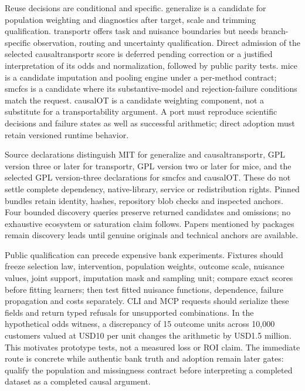 Reuse decisions are conditional and specific. generalize is a candidate for population weighting and diagnostics after target, scale and trimming qualification. transportr offers task and nuisance boundaries but needs branch-specific observation, routing and uncertainty qualification. Direct admission of the selected causaltransportr score is deferred pending correction or a justified interpretation of its odds and normalization, followed by public parity tests. mice is a candidate imputation and pooling engine under a per-method contract; smcfcs is a candidate where its substantive-model and rejection-failure conditions match the request. causalOT is a candidate weighting component, not a substitute for a transportability argument. A port must reproduce scientific decisions and failure states as well as successful arithmetic; direct adoption must retain versioned runtime behavior.\citep{exec25_rtm_choice}

Source declarations distinguish MIT for generalize and causaltransportr, GPL version three or later for transportr, GPL version two or later for mice, and the selected GPL version-three declarations for smcfcs and causalOT. These do not settle complete dependency, native-library, service or redistribution rights. Pinned bundles retain identity, hashes, repository blob checks and inspected anchors. Four bounded discovery queries preserve returned candidates and omissions; no exhaustive ecosystem or saturation claim follows. Papers mentioned by packages remain discovery leads until genuine originals and technical anchors are available.\citep{exec25_rtm_generalize,exec25_rtm_transportr,exec25_rtm_causaltransportr,exec25_rtm_mice,exec25_rtm_smcfcs,exec25_rtm_causalOT,exec25_rtm_choice}

Public qualification can precede expensive bank experiments. Fixtures should freeze selection law, intervention, population weights, outcome scale, nuisance values, joint support, imputation mask and sampling unit; compare exact scores before fitting learners; then test fitted nuisance functions, dependence, failure propagation and costs separately. CLI and MCP requests should serialize these fields and return typed refusals for unsupported combinations. In the hypothetical odds witness, a discrepancy of 15 outcome units across 10,000 customers valued at USD10 per unit changes the arithmetic by USD1.5 million. This motivates prototype tests, not a measured loss or ROI claim. The immediate route is concrete while authentic bank truth and adoption remain later gates: qualify the population and missingness contract before interpreting a completed dataset as a completed causal argument.\citep{exec25_rtm_choice}
